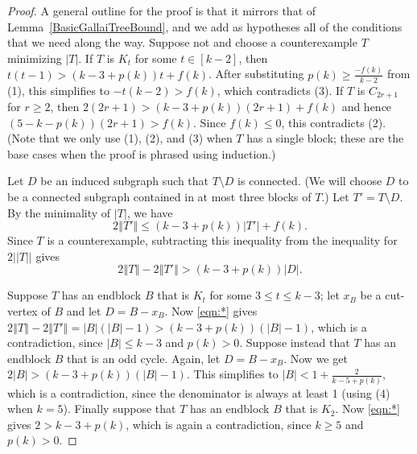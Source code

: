 \documentclass[12pt]{article}
\theoremstyle{plain}
\theoremstyle{definition}
\theoremstyle{remark}
\newcommand{\set}[1]{\left\{ #1 \right\}}
\newcommand{\card}[1]{\left|#1\right|}
\newcommand{\size}[1]{\left\Vert#1\right\Vert}
\newcommand{\irange}[1]{\left[#1\right]}
\newcommand{\parens}[1]{\left( #1 \right)}
\begin{document}
\begin{proof}
A general outline for the proof is that it mirrors that of
Lemma~\ref{BasicGallaiTreeBound}, and we add as hypotheses all of the conditions that
we need along the way.
Suppose not and choose a counterexample $T$ minimizing $|T|$.  If $T$ is $K_t$
for some $t \in \irange{k-2}$, then $t(t-1) > (k-3 + p(k))t + f(k)$.
After substituting $p(k)\ge \frac{-f(k)}{k-2}$ from (1), this simplifies to
$-t(k-2)>f(k)$, 
which contradicts (3).  If $T$ is $C_{2r+1}$ for $r \ge 2$, then $2(2r+1) > (k-3 +
p(k))(2r+1) + f(k)$ and hence $(5-k-p(k))(2r+1)>f(k)$.
Since $f(k)\le 0$, this contradicts (2).  (Note that we only use (1), (2), and (3) when $T$ has a single block;
these are the base cases when the proof is phrased using induction.)

Let $D$ be an %
induced subgraph such that $T\setminus D$ is connected.  (We will choose $D$ to
be a connected subgraph contained in at most three blocks of $T$.)
Let $T' = T \setminus D$. %
By the minimality of $|T|$, we have
	\[2\size{T'} \le (k-3 + p(k))\card{T'} + f(k).\]
	Since $T$ is a counterexample, subtracting this inequality from the inequality for
$2||T||$ gives
	\begin{equation}
	2\size{T} - 2\size{T'} > (k-3 + p(k))|D|. \tag{*}\label{eqn:*}
	\end{equation}
	
Suppose $T$ has an endblock $B$ that 
is $K_t$ for some $3 \le
t \le k-3$; let $x_B$ be a cut-vertex of $B$ 
and let $D=B-x_B$.
Now \eqref{eqn:*} gives $2\size{T}-2\size{T'} =
\card{B}(\card{B}-1)>(k-3+p(k))(|B|-1)$, which 
is a contradiction, since $|B|\le k-3$ and $p(k)>0$.
Suppose instead that $T$ has an endblock $B$ that is an odd cycle.  Again, let
$D=B-x_B$.  Now we get $2|B|>(k-3+p(k))(|B|-1)$.  This simplifies to $|B|<1+\frac2{k-5+p(k)}$, which is a contradiction, 
since the denominator is always at least 1 (using (4) when $k=5$).
Finally suppose that $T$ has an endblock $B$ that is $K_2$. Now \eqref{eqn:*} gives
$2 > k-3 + p(k)$, which is again a contradiction, since $k \ge 5$ and $p(k) > 0$.
	

\end{proof}
\end{document}
